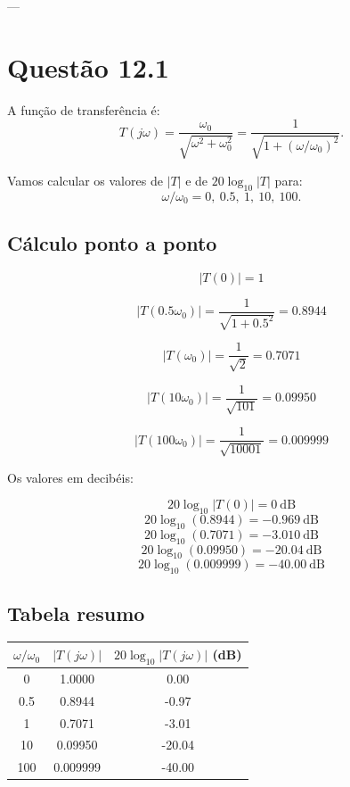 ---

\section*{Questão 12.1}

A função de transferência é:
\[
T(j\omega)=\frac{\omega_0}{\sqrt{\omega^2+\omega_0^2}}
=\frac{1}{\sqrt{1+(\omega/\omega_0)^2}}.
\]

Vamos calcular os valores de $|T|$ e de $20\log_{10}|T|$ para:
\[
\omega/\omega_0 = 0,\ 0.5,\ 1,\ 10,\ 100.
\]

\subsection*{Cálculo ponto a ponto}

\[
|T(0)| = 1
\]

\[
|T(0.5\omega_0)| = \frac{1}{\sqrt{1+0.5^2}}
= 0.8944
\]

\[
|T(\omega_0)| = \frac{1}{\sqrt{2}}
= 0.7071
\]

\[
|T(10\omega_0)| = \frac{1}{\sqrt{101}}
= 0.09950
\]

\[
|T(100\omega_0)| = \frac{1}{\sqrt{10001}}
= 0.009999
\]

Os valores em decibéis:

\[
20\log_{10}|T(0)| = 0\ \text{dB}
\]
\[
20\log_{10}(0.8944) = -0.969\ \text{dB}
\]
\[
20\log_{10}(0.7071) = -3.010\ \text{dB}
\]
\[
20\log_{10}(0.09950) = -20.04\ \text{dB}
\]
\[
20\log_{10}(0.009999) = -40.00\ \text{dB}
\]

\subsection*{Tabela resumo}

\begin{table}[h!]
\centering
\begin{tabular}{c|c|c}
\hline
$\omega/\omega_0$ & $|T(j\omega)|$ & $20\log_{10}|T(j\omega)|$ (dB) \\
\hline
0   & 1.0000   & 0.00 \\
0.5 & 0.8944   & -0.97 \\
1   & 0.7071   & -3.01 \\
10  & 0.09950  & -20.04 \\
100 & 0.009999 & -40.00 \\
\hline
\end{tabular}
\end{table}

